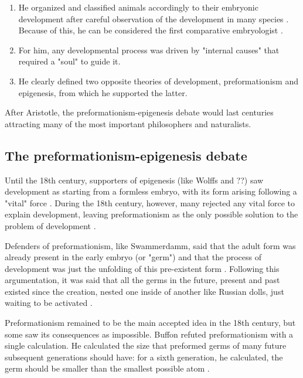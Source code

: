 \begin{enumerate}
\item He organized and classified animals accordingly to their embryonic development after careful observation of the development in many species \citep{aristotle1979generation}. Because of this, he can be considered the first comparative embryologist \citep{Needham1959}.
\item For him, any developmental process was driven by "internal causes" that required a "soul" to guide it.
\item He clearly defined two opposite theories of development, preformationism and epigenesis, from which he supported the latter.
\end{enumerate}

After Aristotle, the preformationism-epigenesis debate would last centuries attracting many of the most important philosophers and naturalists.

\subsection{The preformationism-epigenesis debate}

Until the 18th century, supporters of epigenesis (like Wolffs and ??) saw development as starting from a formless embryo, with its form arising following a "vital" force \citep{amundson2005changing}.
%
During the 18th century, however, many rejected any vital force to explain development, leaving preformationism as the only possible solution to the problem of development \citep{jacob1973_logic}. 

Defenders of preformationism, like Swammerdamm, said that the adult form was already present in the early embryo (or "germ") and that the process of development was just the unfolding of this pre-existent form \citep{amundson2005changing}.
Following this argumentation, it was said that all the germs in the future, present and past existed since the creation, nested one inside of another like Russian dolls, just waiting to be activated \citep{jacob1973_logic}.

Preformationism remained to be the main accepted idea in the 18th century, but some saw its consequences as impossible. Buffon refuted preformationism with a single calculation. He calculated the size that preformed germs of many future subsequent generations should have: for a sixth generation, he calculated, the germ should be smaller than the smallest possible atom \citep{buffon1807buffon}.


